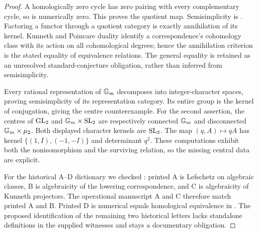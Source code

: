 \begin{proof}
A homologically zero cycle has zero pairing with every complementary cycle, so is numerically zero. This proves the quotient map. Semisimplicity is \cite[Theorem 1, p.448]{AuditJannsen1992}. Factoring a functor through a quotient category is exactly annihilation of its kernel. Kunneth and Poincare duality identify a correspondence's cohomology class with its action on all cohomological degrees; hence the annihilation criterion is the stated equality of equivalence relations. The general equality is retained as an unresolved standard-conjecture obligation, rather than inferred from semisimplicity.

Every rational representation of $\mathbb G_m$ decomposes into integer-character spaces, proving semisimplicity of its representation category. Its entire group is the kernel of conjugation, giving the centre counterexample. For the second assertion, the centres of $\operatorname{GL}_2$ and $\mathbb G_m\times\operatorname{SL}_2$ are respectively connected $\mathbb G_m$ and disconnected $\mathbb G_m\times\mu_2$. Both displayed character kernels are $\operatorname{SL}_2$. The map $(q,A)\mapsto qA$ has kernel $\{(1,I),(-1,-I)\}$ and determinant $q^2$. These computations exhibit both the nonisomorphism and the surviving relation, so the missing central data are explicit.

For the historical A--D dictionary we checked \cite[pp.195--197]{AuditGrothendieck1969}: printed A is Lefschetz on algebraic classes, B is algebraicity of the lowering correspondence, and C is algebraicity of Kunneth projectors. The operational manuscript A and C therefore match printed A and B. Printed D is numerical equals homological equivalence in \cite[p.17, Proposition 5-1]{AuditKleiman1994}. The proposed identification of the remaining two historical letters lacks standalone definitions in the supplied witnesses and stays a documentary obligation.


\end{proof}
